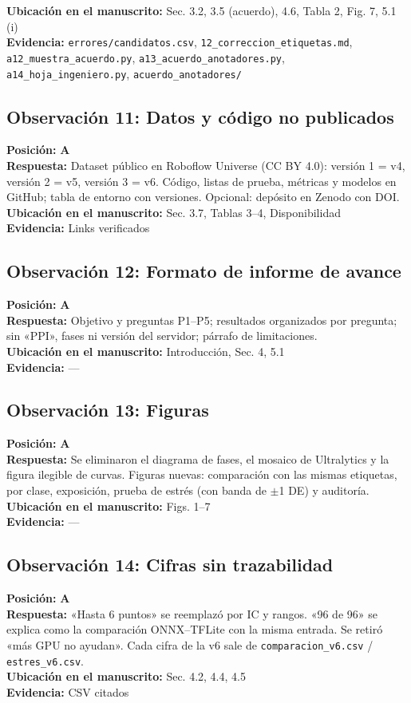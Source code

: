 \documentclass[11pt,a4paper]{article}
\begin{document}
\textbf{Ubicación en el manuscrito:} Sec. 3.2, 3.5 (acuerdo), 4.6, Tabla 2, Fig. 7, 5.1 (i)\\
\textbf{Evidencia:} \texttt{errores/candidatos.csv}, \texttt{12\_correccion\_etiquetas.md}, \texttt{a12\_muestra\_acuerdo.py}, \texttt{a13\_acuerdo\_anotadores.py}, \texttt{a14\_hoja\_ingeniero.py}, \texttt{acuerdo\_anotadores/}

\subsection*{Observación 11: Datos y código no publicados}
\noindent\textbf{Posición:} \textbf{A}\\
\textbf{Respuesta:} Dataset público en Roboflow Universe (CC BY 4.0): versión 1 = v4, versión 2 = v5, versión 3 = v6. Código, listas de prueba, métricas y modelos en GitHub; tabla de entorno con versiones. Opcional: depósito en Zenodo con DOI.\\
\textbf{Ubicación en el manuscrito:} Sec. 3.7, Tablas 3–4, Disponibilidad\\
\textbf{Evidencia:} Links verificados

\subsection*{Observación 12: Formato de informe de avance}
\noindent\textbf{Posición:} \textbf{A}\\
\textbf{Respuesta:} Objetivo y preguntas P1–P5; resultados organizados por pregunta; sin «PPI», fases ni versión del servidor; párrafo de limitaciones.\\
\textbf{Ubicación en el manuscrito:} Introducción, Sec. 4, 5.1\\
\textbf{Evidencia:} —

\subsection*{Observación 13: Figuras}
\noindent\textbf{Posición:} \textbf{A}\\
\textbf{Respuesta:} Se eliminaron el diagrama de fases, el mosaico de Ultralytics y la figura ilegible de curvas. Figuras nuevas: comparación con las mismas etiquetas, por clase, exposición, prueba de estrés (con banda de $\pm$1 DE) y auditoría.\\
\textbf{Ubicación en el manuscrito:} Figs. 1–7\\
\textbf{Evidencia:} —

\subsection*{Observación 14: Cifras sin trazabilidad}
\noindent\textbf{Posición:} \textbf{A}\\
\textbf{Respuesta:} «Hasta 6 puntos» se reemplazó por IC y rangos. «96 de 96» se explica como la comparación ONNX–TFLite con la misma entrada. Se retiró «más GPU no ayudan». Cada cifra de la v6 sale de \texttt{comparacion\_v6.csv} / \texttt{estres\_v6.csv}.\\
\textbf{Ubicación en el manuscrito:} Sec. 4.2, 4.4, 4.5\\
\textbf{Evidencia:} CSV citados
\end{document}
